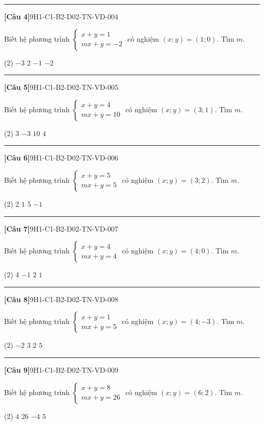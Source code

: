 \documentclass[12pt,a4paper]{article}
\newif\ifloigiai
\newenvironment{cauhoi}[2]{%
  \par\medskip\noindent\rule{\textwidth}{0.4pt}\par\nopagebreak
  \noindent\textbf{[#1]}\hfill{\scriptsize\ttfamily #2}\par\nopagebreak\smallskip}{\par}
\newcommand{\dapan}[1]{\ifloigiai\par\smallskip\noindent\textit{Đáp án:} \textbf{#1}\par\fi}
\begin{document}
\begin{cauhoi}{Câu 4}{9H1-C1-B2-D02-TN-VD-004}
Biết hệ phương trình $\begin{cases}x+y=1\\ mx+y=-2\end{cases}$ có nghiệm $(x;y)=(1;0)$. Tìm $m$.
\begin{tasks}(2)
\task $-3$
\task $2$
\task $-1$
\task $-2$
\end{tasks}
\dapan{D}
\end{cauhoi}
\begin{cauhoi}{Câu 5}{9H1-C1-B2-D02-TN-VD-005}
Biết hệ phương trình $\begin{cases}x+y=4\\ mx+y=10\end{cases}$ có nghiệm $(x;y)=(3;1)$. Tìm $m$.
\begin{tasks}(2)
\task $3$
\task $-3$
\task $10$
\task $4$
\end{tasks}
\dapan{A}
\end{cauhoi}
\begin{cauhoi}{Câu 6}{9H1-C1-B2-D02-TN-VD-006}
Biết hệ phương trình $\begin{cases}x+y=5\\ mx+y=5\end{cases}$ có nghiệm $(x;y)=(3;2)$. Tìm $m$.
\begin{tasks}(2)
\task $2$
\task $1$
\task $5$
\task $-1$
\end{tasks}
\dapan{B}
\end{cauhoi}
\begin{cauhoi}{Câu 7}{9H1-C1-B2-D02-TN-VD-007}
Biết hệ phương trình $\begin{cases}x+y=4\\ mx+y=4\end{cases}$ có nghiệm $(x;y)=(4;0)$. Tìm $m$.
\begin{tasks}(2)
\task $4$
\task $-1$
\task $2$
\task $1$
\end{tasks}
\dapan{D}
\end{cauhoi}
\begin{cauhoi}{Câu 8}{9H1-C1-B2-D02-TN-VD-008}
Biết hệ phương trình $\begin{cases}x+y=1\\ mx+y=5\end{cases}$ có nghiệm $(x;y)=(4;-3)$. Tìm $m$.
\begin{tasks}(2)
\task $-2$
\task $3$
\task $2$
\task $5$
\end{tasks}
\dapan{C}
\end{cauhoi}
\begin{cauhoi}{Câu 9}{9H1-C1-B2-D02-TN-VD-009}
Biết hệ phương trình $\begin{cases}x+y=8\\ mx+y=26\end{cases}$ có nghiệm $(x;y)=(6;2)$. Tìm $m$.
\begin{tasks}(2)
\task $4$
\task $26$
\task $-4$
\task $5$
\end{tasks}
\dapan{A}
\end{cauhoi}
\end{document}
